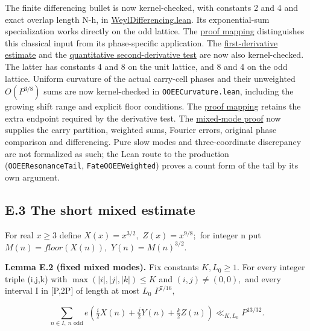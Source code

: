 \documentclass[11pt,a4paper]{article}
\begin{document}
The finite differencing bullet is now kernel-checked, with constants 2
and 4 and exact overlap length N-h, in
\href{../../formal/BTCalculus/WeylDifferencing.lean}{WeylDifferencing.lean}.
Its exponential-sum specialization works directly on the odd lattice.
The
\href{https://github.com/sneakyweasel/btlab/blob/main/docs/theory/finite_weyl_differencing_note.md}{proof
mapping} distinguishes this classical input from its phase-specific
application. The
\href{https://github.com/sneakyweasel/btlab/blob/main/docs/theory/first_derivative_power_cancellation_note.md}{first-derivative
estimate} and the
\href{https://github.com/sneakyweasel/btlab/blob/main/docs/theory/second_derivative_cancellation_note.md}{quantitative
second-derivative test} are now also kernel-checked. The latter has
constants 4 and 8 on the unit lattice, and 8 and 4 on the odd lattice.
Uniform curvature of the actual carry-cell phases and their unweighted
\(O(P^{3/8})\) sums are now kernel-checked in
\texttt{\nolinkurl{OOEECurvature.lean}}, including the growing shift
range and explicit floor conditions. The
\href{https://github.com/sneakyweasel/btlab/blob/main/docs/theory/juggler_ooee_curvature_note.md}{proof
mapping} retains the extra endpoint required by the derivative test. The
\href{https://github.com/sneakyweasel/btlab/blob/main/docs/theory/juggler_ooee_mixed_modes_note.md}{mixed-mode
proof} now supplies the carry partition, weighted sums, Fourier errors,
original phase comparison and differencing. Pure slow modes and
three-coordinate discrepancy are not formalized as such; the Lean route
to the production (\texttt{\nolinkurl{OOEEResonanceTail}},
\texttt{\nolinkurl{FateOOEEWeighted}}) proves a count form of the tail
by its own argument.

\subsection{E.3 The short mixed
estimate}\label{e.3-the-short-mixed-estimate}

For real \(x\ge 3\) define \(X(x)=x^{3/2},\) \(Z(x)=x^{9/8};\) for
integer n put \(M(n)=floor(X(n)),\) \(Y(n)=M(n)^{3/2}.\)

\textbf{Lemma E.2 (fixed mixed modes).} Fix constants \(K,L_0\ge 1.\)
For every integer triple (i,j,k) with \(\max(|i|,|j|,|k|)\le K\) and
\((i,j)\ne (0,0),\) and every interval I in {[}P,2P{]} of length at most
\(L_0\) \(P^{7/16},\)

\[
 \sum_{n\in I,\ n\text{ odd}}
 e\left(\tfrac i2 X(n)+\tfrac j2 Y(n)+\tfrac k2 Z(n)\right)
       \ll_{K,L_0} P^{13/32}.
 \tag{E.5}
\]
\end{document}
